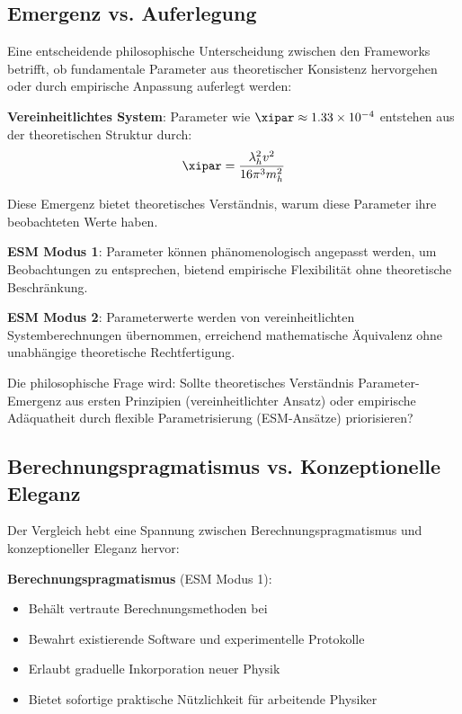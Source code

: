 	\subsection{Emergenz vs. Auferlegung}
	\label{subsec:emergence_imposition}
	
	Eine entscheidende philosophische Unterscheidung zwischen den Frameworks betrifft, ob fundamentale Parameter aus theoretischer Konsistenz hervorgehen oder durch empirische Anpassung auferlegt werden:
	
	\textbf{Vereinheitlichtes System}: Parameter wie $\xipar \approx 1.33 \times 10^{-4}$ entstehen aus der theoretischen Struktur durch:
	\begin{equation}
		\xipar = \frac{\lambda_h^2 v^2}{16\pi^3 m_h^2}
	\end{equation}
	
	Diese Emergenz bietet theoretisches Verständnis, warum diese Parameter ihre beobachteten Werte haben.
	
	\textbf{ESM Modus 1}: Parameter können phänomenologisch angepasst werden, um Beobachtungen zu entsprechen, bietend empirische Flexibilität ohne theoretische Beschränkung.
	
	\textbf{ESM Modus 2}: Parameterwerte werden von vereinheitlichten Systemberechnungen übernommen, erreichend mathematische Äquivalenz ohne unabhängige theoretische Rechtfertigung.
	
	Die philosophische Frage wird: Sollte theoretisches Verständnis Parameter-Emergenz aus ersten Prinzipien (vereinheitlichter Ansatz) oder empirische Adäquatheit durch flexible Parametrisierung (ESM-Ansätze) priorisieren?
	
	\subsection{Berechnungspragmatismus vs. Konzeptionelle Eleganz}
	\label{subsec:pragmatism_vs_elegance}
	
	Der Vergleich hebt eine Spannung zwischen Berechnungspragmatismus und konzeptioneller Eleganz hervor:
	
	\textbf{Berechnungspragmatismus} (ESM Modus 1):
	\begin{itemize}
		\item Behält vertraute Berechnungsmethoden bei
		\item Bewahrt existierende Software und experimentelle Protokolle
		\item Erlaubt graduelle Inkorporation neuer Physik
		\item Bietet sofortige praktische Nützlichkeit für arbeitende Physiker
	\end{itemize}
	
